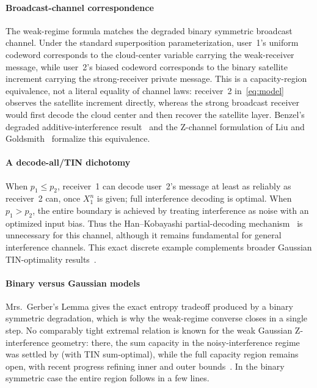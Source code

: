 \documentclass[12pt,draftclsnofoot,onecolumn,conference]{IEEEtran}
\begin{document}
\paragraph{Broadcast-channel correspondence}
The weak-regime formula matches the degraded binary symmetric broadcast
channel. Under the standard superposition parameterization, user~1's
uniform codeword corresponds to the cloud-center variable carrying the
weak-receiver message, while user~2's biased codeword corresponds to the
binary satellite increment carrying the strong-receiver private message.
This is a capacity-region equivalence, not a literal equality of channel
laws: receiver~2 in~\eqref{eq:model} observes the satellite increment
directly, whereas the strong broadcast receiver would first decode the
cloud center and then recover the satellite layer. Benzel's degraded
additive-interference result~\cite{Benzel79} and the Z-channel formulation
of Liu and Goldsmith~\cite{LG09} formalize this equivalence.

\paragraph{A decode-all/TIN dichotomy}
When $p_1\le p_2$, receiver~1 can decode user~2's message at least as
reliably as receiver~2 can, once $X_1^n$ is given; full interference decoding
is optimal. When $p_1>p_2$, the entire boundary is achieved by treating
interference as noise with an optimized input bias. Thus the
Han--Kobayashi partial-decoding mechanism~\cite{HK81} is unnecessary for
this channel, although it remains fundamental for general interference
channels. This exact discrete example complements broader Gaussian
TIN-optimality results~\cite{GNAJ15}.

\paragraph{Binary versus Gaussian models}
Mrs.~Gerber's Lemma gives the exact entropy tradeoff produced by a binary
symmetric degradation, which is why the weak-regime converse closes in a
single step. No comparably tight extremal relation is known for the weak
Gaussian Z-interference geometry: there, the sum capacity in the
noisy-interference regime was settled by
\cite{ShangKramerChen09,AnnapureddyVeeravalli09,MotahariKhandani09} (with
TIN sum-optimal), while the full capacity region remains open, with recent
progress refining inner and outer bounds~\cite{Costa85,CNN24,GNZ24}. In the
binary symmetric case the entire region follows in a few lines.
\end{document}
